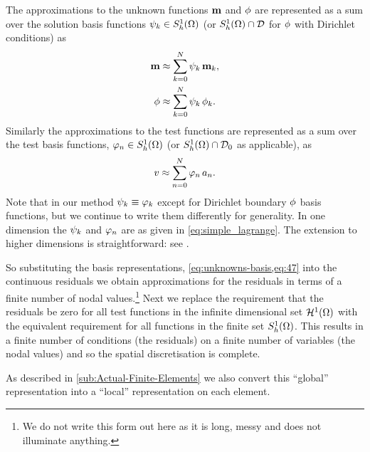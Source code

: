 The approximations to the unknown functions $\mathbf{m}$ and $\phi$ are represented as a sum over the solution basis functions ${\psi_k} \in {S_h^1(\Omega)}$ (or ${S_h^1(\Omega)} \cap \mathcal{D}$ for $\phi$ with Dirichlet conditions) as
\begin{equation}
  \begin{aligned}
    \mathbf{m} &\approx \sum_{k = 0}^{N} {\psi_k} \, \mathbf{m}_k, \\
    \phi &\approx \sum_{k = 0}^{N} {\psi_k} \, \phi_{k}.
    \label{eq:unknowns-basis}
  \end{aligned}
\end{equation}
Similarly the approximations to the test functions are represented as a sum over the test basis functions, ${\varphi_n} \in {S_h^1(\Omega)}$ (or ${S_h^1(\Omega)} \cap \mathcal{D}_0$ as applicable), as
\begin{equation}
  \label{eq:47}
  v \approx \sum_{n = 0}^{N} {\varphi_n} \, a_n.
\end{equation}
Note that in our method $\psi_k \equiv \varphi_k$ except for Dirichlet boundary $\phi$ basis functions, but we continue to write them differently for generality.
In one dimension the ${\psi_k}$ and ${\varphi_n}$ are as given in \cref{eq:simple_lagrange}.
The extension to higher dimensions is straightforward: see \eg \cite[25]{HowardElmanDavidSilvester2006}.

So substituting the basis representations, \cref{eq:unknowns-basis,eq:47} into the continuous residuals we obtain approximations for the residuals in terms of a finite number of nodal values.\footnote{We do not write this form out here as it is long, messy and does not illuminate anything.}
Next we replace the requirement that the residuals be zero for all test functions in the infinite dimensional set ${\mathcal{H}^1(\Omega)}$ with the equivalent requirement for all functions in the finite set ${S_h^1(\Omega)}$. 
This results in a finite number of conditions (the residuals) on a finite number of variables (the nodal values) and so the spatial discretisation is complete.

As described in \cref{sub:Actual-Finite-Elements} we also convert this ``global'' representation into a ``local'' representation on each element.



